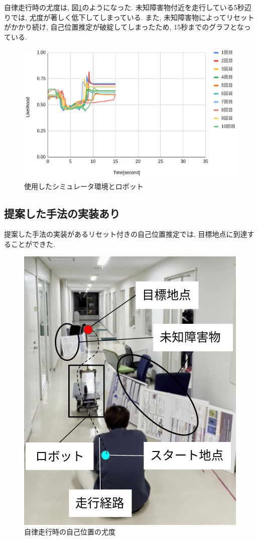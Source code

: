 自律走行時の尤度は, 図\ref{fig:nav_likelihood_no_imp_real}のようになった. 
未知障害物付近を走行している5秒辺りでは, 尤度が著しく低下してしまっている. 
また, 未知障害物によってリセットがかかり続け, 自己位置推定が破綻してしまったため, 15秒までのグラフとなっている. 

\begin{figure}[H]
  \begin{center}
    \includegraphics[width=0.98\linewidth]{figs/real_likelihood_before.png}
    \caption{使用したシミュレータ環境とロボット}
    \label{fig:nav_likelihood_no_imp_real}
  \end{center}
\end{figure}

\subsection{提案した手法の実装あり}

提案した手法の実装があるリセット付きの自己位置推定では, 目標地点に到達することができた. 

\begin{figure}[H]
  \begin{center}
    \includegraphics[width=0.5\linewidth]{figs/real_environment.png}
    \caption{自律走行時の自己位置の尤度}
    \label{fig:nav_imp_real}
  \end{center}
\end{figure}

